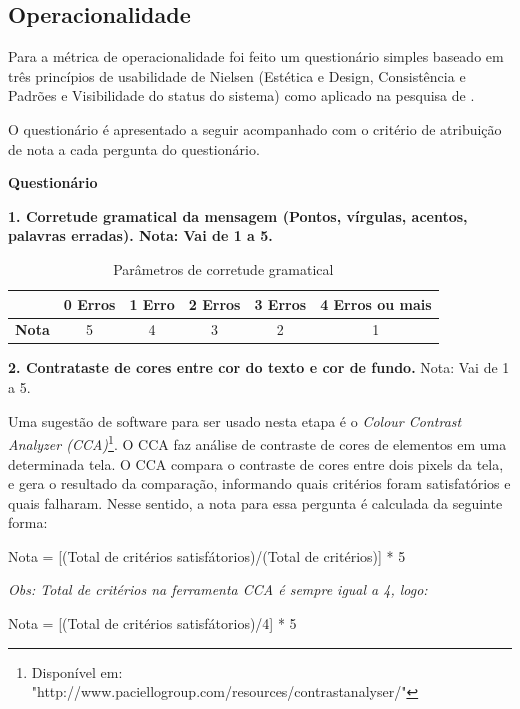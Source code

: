 \begin{apendicesenv}
\section{Operacionalidade}

Para a métrica de operacionalidade foi feito um questionário simples baseado em três princípios de usabilidade de Nielsen (Estética e Design, Consistência e Padrões e Visibilidade do status do sistema) como aplicado na pesquisa de .

O questionário é apresentado a seguir acompanhado com o critério de atribuição de nota a cada pergunta do questionário.

	\textbf{Questionário}
	
\textbf{1.	Corretude gramatical da mensagem (Pontos, vírgulas, acentos, palavras erradas).  Nota: Vai de 1 a 5.}

\begin{table}[htbp]
  \centering
  \caption{Parâmetros de corretude gramatical}
    \begin{tabular}{cccccc}
    \toprule
          & \textbf{0 Erros} & \textbf{1 Erro} & \textbf{2 Erros} & \textbf{3 Erros} & \textbf{4 Erros ou mais} \\
    \midrule
    \textbf{Nota} & 5     & 4     & 3     & 2     & 1 \\
    \bottomrule
    \end{tabular}%
  \label{corretude_gramatical}%
\end{table}%

\textbf{2}\textbf{.	Contrataste de cores entre cor do texto e cor de fundo.} Nota: Vai de 1 a 5.
	
Uma sugestão de software para ser usado nesta etapa é o  \textit{Colour Contrast Analyzer (CCA)}\footnote{Disponível em: "http://www.paciellogroup.com/resources/contrastanalyser/"}. O CCA faz análise de contraste de cores de elementos em uma determinada tela. O CCA compara o contraste de cores entre dois pixels da tela, e gera o resultado da comparação, informando quais critérios foram satisfatórios e quais falharam. Nesse sentido, a nota para essa pergunta é calculada da seguinte forma:

Nota = [(Total de critérios satisfátorios)/(Total de critérios)] * 5

\textit{Obs: Total de critérios na ferramenta CCA é sempre igual a 4, logo:}

Nota = [(Total de critérios satisfátorios)/4] * 5


\end{apendicesenv}
